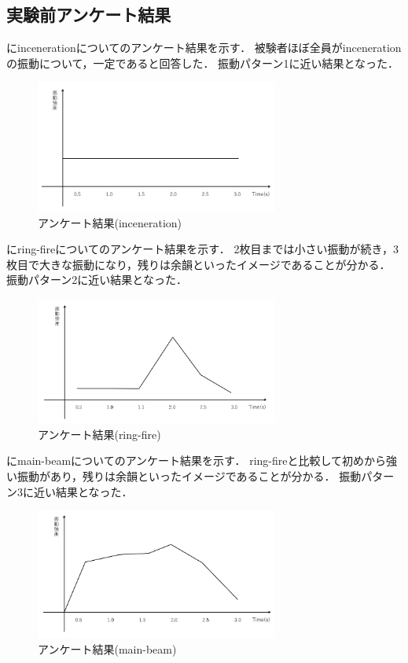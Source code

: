 \subsection{実験前アンケート結果}
にincenerationについてのアンケート結果を示す．
被験者ほぼ全員がincenerationの振動について，一定であると回答した．
振動パターン1に近い結果となった．

\newpage

\begin{figure}[h]
\centering
\includegraphics[clip,width=8cm]{fig/incenerationAve.png}
\caption{アンケート結果(inceneration)}\label{inceA}
\end{figure}

にring-fireについてのアンケート結果を示す．
2枚目までは小さい振動が続き，3枚目で大きな振動になり，残りは余韻といったイメージであることが分かる．
振動パターン2に近い結果となった．
\begin{figure}[h]
\centering
\includegraphics[clip,width=8cm]{fig/ringfireAve.png}
\caption{アンケート結果(ring-fire)}\label{ringA}
\end{figure}



にmain-beamについてのアンケート結果を示す．
ring-fireと比較して初めから強い振動があり，残りは余韻といったイメージであることが分かる．
振動パターン3に近い結果となった．
\begin{figure}[h]
\centering
\includegraphics[clip,width=8cm]{fig/mainbeamAve.png}
\caption{アンケート結果(main-beam)}\label{mainA}
\end{figure}


